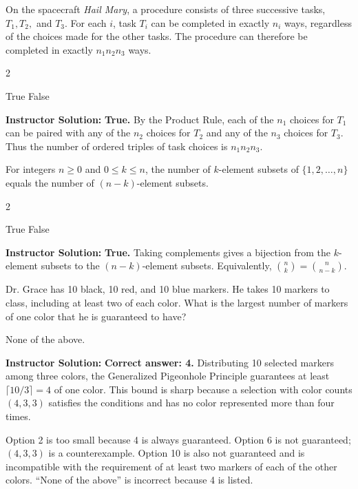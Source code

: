 \documentclass[11pt,addpoints]{exam}
\renewenvironment{solution}
{\par\medskip\noindent\hrulefill\par\smallskip\noindent\textbf{Instructor Solution:}\enspace\ignorespaces}
{\par\smallskip\noindent\hrulefill\par\medskip}
\begin{document}
\begin{questions}
\question[3] On the spacecraft \textit{Hail Mary}, a procedure consists of three successive tasks, $T_1,T_2,$ and $T_3$. For each $i$, task $T_i$ can be completed in exactly $n_i$ ways, regardless of the choices made for the other tasks. The procedure can therefore be completed in exactly $n_1n_2n_3$ ways.
\begin{multicols}{2}
\begin{choices}
    \CorrectChoice True
    \choice False
\end{choices}
\end{multicols}
\begin{solution}
\textbf{True.} By the Product Rule, each of the $n_1$ choices for $T_1$ can be paired with any of the $n_2$ choices for $T_2$ and any of the $n_3$ choices for $T_3$. Thus the number of ordered triples of task choices is $n_1n_2n_3$.
\end{solution}

\question[3] For integers $n\ge 0$ and $0\le k\le n$, the number of $k$-element subsets of $\{1,2,\ldots,n\}$ equals the number of $(n-k)$-element subsets.
\begin{multicols}{2}
\begin{choices}
    \CorrectChoice True
    \choice False
\end{choices}
\end{multicols}
\begin{solution}
\textbf{True.} Taking complements gives a bijection from the $k$-element subsets to the $(n-k)$-element subsets. Equivalently, $\binom{n}{k}=\binom{n}{n-k}$.
\end{solution}

\newpage

\question[5] Dr. Grace has 10 black, 10 red, and 10 blue markers. He takes 10 markers to class, including at least two of each color. What is the largest number of markers of one color that he is guaranteed to have?
\begin{choices}
    \choice None of the above.
\end{choices}
\begin{solution}
\textbf{Correct answer: 4.} Distributing 10 selected markers among three colors, the Generalized Pigeonhole Principle guarantees at least $\lceil 10/3\rceil=4$ of one color. This bound is sharp because a selection with color counts $(4,3,3)$ satisfies the conditions and has no color represented more than four times.

Option 2 is too small because 4 is always guaranteed. Option 6 is not guaranteed; $(4,3,3)$ is a counterexample. Option 10 is also not guaranteed and is incompatible with the requirement of at least two markers of each of the other colors. ``None of the above'' is incorrect because 4 is listed.
\end{solution}


\end{questions}
\end{document}
